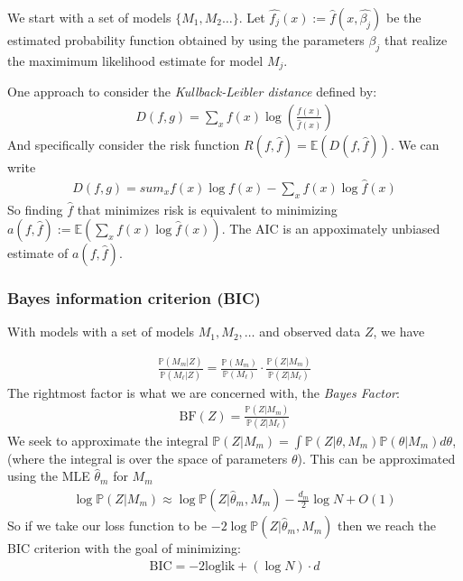 \documentclass[12pt]{article}
\newcommand{\PP}{\ensuremath{\mathbb{P}}}
\begin{document}
We start with a set of models $\{M_1, M_2  \ldots \}$. Let $\widehat{f_j}(x) :=
\hat f(x , \widehat{\beta_j})$ be
the estimated probability function obtained by using the parameters $\beta_j$
that realize the maximimum likelihood estimate for model $M_j$.

One approach \cite[\S13.9]{wasserman} to consider the {\sl Kullback-Leibler
  distance} defined by:
\begin{align*}
  D(f,g) = \sum_x f(x) \log\left(\frac{f(x)}{\hat f(x)} \right)
\end{align*}
And specifically consider the risk function $R(f,\hat f) = \mathbb{E}(D(f,\hat
f))$. We can write
\begin{align*}
  D(f,g ) =sum_x f(x) \log f(x)  - \sum_x f(x)\log \hat f(x)
\end{align*}
So finding $\hat f$ that minimizes risk is equivalent to minimizing $a(f, \hat
f):= \mathbb{E}\left( \sum_x f(x) \log \hat f(x) \right)$. The AIC is an
appoximately unbiased estimate of $a(f,\hat f)$.

\subsubsection{Bayes information criterion (BIC)}

With models with a set of models $M_1,M_2, \ldots $ and observed data $Z$, we
have

\begin{align*}
\frac{ \PP (M_m | Z) }{\PP(M_\ell|Z)} = \frac{\PP(M_m)}{\PP(M_\ell)} \cdot \frac{\PP(Z | M_m)}{\PP(Z | M_\ell)} 
\end{align*}
The rightmost factor is what we are concerned with, the {\sl Bayes Factor}:
\begin{align*}
  \text{BF}(Z) = \frac{\PP(Z | M_m)}{\PP(Z | M_\ell)} 
\end{align*}
We seek to approximate the integral $\PP(Z | M_m) = \displaystyle\int \PP(Z | \theta,M_m)
\PP(\theta |M_m) d\theta$, (where the integral is over the space of parameters
$\theta$). This can be approximated using the MLE $\hat \theta_m$ for $M_m$
\begin{align*}
  \log \PP(Z |M_m) \approx \log \PP(Z | \hat \theta_m, M_m ) - \frac{d_m}{2} \log N + O(1)
\end{align*}
So if we take our loss function to be $-2 \log \PP(Z | \hat \theta_m , M_m)$
then we reach the BIC criterion with the goal of minimizing:
\begin{align*}
  \text{BIC} = -2 \text{loglik} + (\log N )\cdot d
\end{align*}
\end{document}

